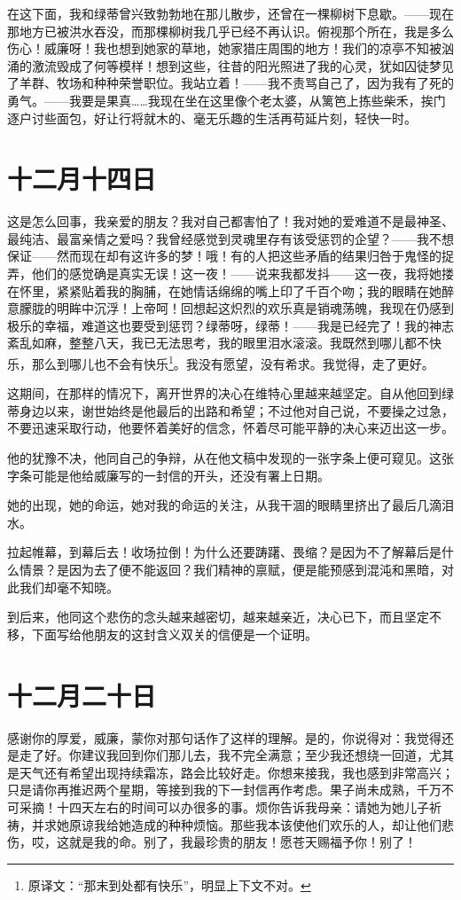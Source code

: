 \documentclass[12pt,oneside]{book}
\begin{document}
在这下面，我和绿蒂曾兴致勃勃地在那儿散步，还曾在一棵柳树下息歇。——现在那地方已被洪水吞没，而那棵柳树我几乎已经不再认识。俯视那个所在，我是多么伤心！威廉呀！我也想到她家的草地，她家猎庄周围的地方！我们的凉亭不知被汹涌的激流毁成了何等模样！想到这些，往昔的阳光照进了我的心灵，犹如囚徒梦见了羊群、牧场和种种荣誉职位。我站立着！——我不责骂自己了，因为我有了死的勇气。——我要是果真……我现在坐在这里像个老太婆，从篱笆上拣些柴禾，挨门逐户讨些面包，好让行将就木的、毫无乐趣的生活再苟延片刻，轻快一时。
　　

\chapter{十二月十四日}
\label{sec-5-2}
这是怎么回事，我亲爱的朋友？我对自己都害怕了！我对她的爱难道不是最神圣、最纯洁、最富亲情之爱吗？我曾经感觉到灵魂里存有该受惩罚的企望？——我不想保证——然而现在却有这许多的梦！哦！有的人把这些矛盾的结果归咎于鬼怪的捉弄，他们的感觉确是真实无误！这一夜！——说来我都发抖——这一夜，我将她搂在怀里，紧紧贴着我的胸脯，在她情话绵绵的嘴上印了千百个吻；我的眼睛在她醉意朦胧的明眸中沉浮！上帝呵！回想起这炽烈的欢乐真是销魂荡魄，我现在仍感到极乐的幸福，难道这也要受到惩罚？绿蒂呀，绿蒂！——我是已经完了！我的神志紊乱如麻，整整八天，我已无法思考，我的眼里泪水滚滚。我既然到哪儿都不快乐，那么到哪儿也不会有快乐\footnote{原译文：“那末到处都有快乐”，明显上下文不对。}。我没有愿望，没有希求。我觉得，走了更好。

\begin{framed}
这期间，在那样的情况下，离开世界的决心在维特心里越来越坚定。自从他回到绿蒂身边以来，谢世始终是他最后的出路和希望；不过他对自己说，不要操之过急，不要迅速采取行动，他要怀着美好的信念，怀着尽可能平静的决心来迈出这一步。

他的犹豫不决，他同自己的争辩，从在他文稿中发现的一张字条上便可窥见。这张字条可能是他给威廉写的一封信的开头，还没有署上日期。
\end{framed}

她的出现，她的命运，她对我的命运的关注，从我干涸的眼睛里挤出了最后几滴泪水。

拉起帷幕，到幕后去！收场拉倒！为什么还要踌躇、畏缩？是因为不了解幕后是什么情景？是因为去了便不能返回？我们精神的禀赋，便是能预感到混沌和黑暗，对此我们却毫不知晓。

\begin{framed}
到后来，他同这个悲伤的念头越来越密切，越来越亲近，决心已下，而且坚定不移，下面写给他朋友的这封含义双关的信便是一个证明。
\end{framed}

\chapter{十二月二十日}
\label{sec-5-3}
感谢你的厚爱，威廉，蒙你对那句话作了这样的理解。是的，你说得对：我觉得还是走了好。你建议我回到你们那儿去，我不完全满意；至少我还想绕一回道，尤其是天气还有希望出现持续霜冻，路会比较好走。你想来接我，我也感到非常高兴；只是请你再推迟两个星期，等接到我的下一封信再作考虑。果子尚未成熟，千万不可采摘！十四天左右的时间可以办很多的事。烦你告诉我母亲：请她为她儿子祈祷，并求她原谅我给她造成的种种烦恼。那些我本该使他们欢乐的人，却让他们悲伤，哎，这就是我的命。别了，我最珍贵的朋友！愿苍天赐福予你！别了！
\end{document}
